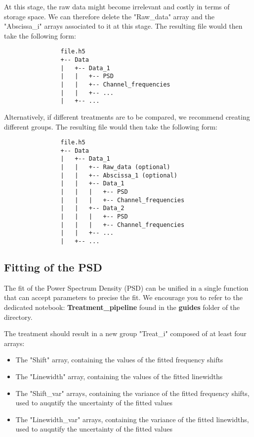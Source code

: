 \documentclass{article}
\begin{document}
            At this stage, the raw data might become irrelevant and costly in terms of storage space. We can therefore delete the "Raw\_data" array and the "Abscissa\_i" arrays associated to it at this stage. The resulting file would then take the following form:

            \begin{verbatim}
                file.h5
                +-- Data
                |   +-- Data_1
                |   |   +-- PSD
                |   |   +-- Channel_frequencies
                |   |   +-- ...
                |   +-- ...
            \end{verbatim}

            Alternatively, if different treatments are to be compared, we recommend creating different groups. The resulting file would then take the following form:

            \begin{verbatim}
                file.h5
                +-- Data
                |   +-- Data_1
                |   |   +-- Raw_data (optional)
                |   |   +-- Abscissa_1 (optional)
                |   |   +-- Data_1
                |   |   |   +-- PSD
                |   |   |   +-- Channel_frequencies
                |   |   +-- Data_2
                |   |   |   +-- PSD
                |   |   |   +-- Channel_frequencies
                |   |   +-- ...
                |   +-- ...
            \end{verbatim}

        \subsection{Fitting of the PSD}

            The fit of the Power Spectrum Density (PSD) can be unified in a single function that can accept parameters to precise the fit. We encourage you to refer to the dedicated notebook: \textbf{Treatment\_pipeline} found in the \textbf{guides} folder of the directory.

            The treatment should result in a new group "Treat\_i" composed of at least four arrays:
            \begin{itemize}
                \item The "Shift" array, containing the values of the fitted frequency shifts
                \item The "Linewidth" array, containing the values of the fitted linewidths
                \item The "Shift\_var" arrays, containing the variance of the fitted frequency shifts, used to auqntify the uncertainty of the fitted values
                \item The "Linewidth\_var" arrays, containing the variance of the fitted linewidths, used to auqntify the uncertainty of the fitted values
            \end{itemize}
\end{document}
